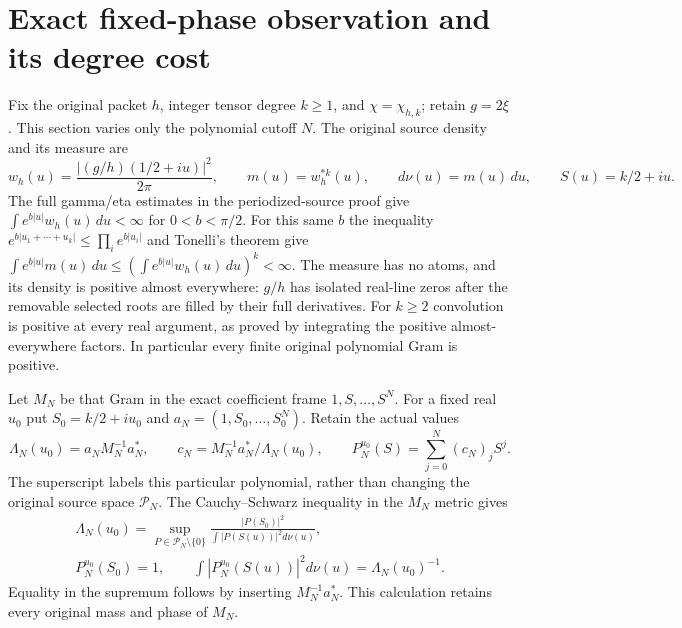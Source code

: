 \documentclass{article}
\begin{document}
\maketitle
\section{Exact fixed-phase observation and its degree cost}
\label{sec:holonomy-degree-cost}

Fix the original packet $h$, integer tensor degree $k\ge1$, and
$\chi=\chi_{h,k}$; retain $g=2\xi$. This section varies only the
polynomial cutoff $N$. The original source density and its measure are
\[
 w_h(u)=\frac{|(g/h)(1/2+iu)|^2}{2\pi},\qquad
 m(u)=w_h^{*k}(u),\qquad d\nu(u)=m(u)\,du,
 \qquad S(u)=k/2+iu .
 \tag{HD1}
\]
The full gamma/eta estimates in the periodized-source proof give
$\int e^{b|u|}w_h(u)\,du<\infty$ for $0<b<\pi/2$.
For this same $b$ the inequality
$e^{b|u_1+\cdots+u_k|}\le\prod_i e^{b|u_i|}$ and Tonelli's theorem
give
$\int e^{b|u|}m(u)\,du\le(\int e^{b|u|}w_h(u)\,du)^k<\infty$.
The measure has no atoms, and its density is positive almost everywhere:
$g/h$ has isolated real-line zeros after the removable selected roots
are filled by their full derivatives. For $k\ge2$ convolution is
positive at every real argument, as proved by integrating the positive
almost-everywhere factors. In particular every finite original
polynomial Gram is positive.

Let $M_N$ be that Gram in the exact coefficient frame
$1,S,\ldots,S^N$. For a fixed real $u_0$ put $S_0=k/2+iu_0$ and
$a_N=(1,S_0,\ldots,S_0^N)$. Retain the actual values
\[
 \Lambda_N(u_0)=a_NM_N^{-1}a_N^*,\qquad
 c_N=M_N^{-1}a_N^*/\Lambda_N(u_0),\qquad
 P_N^{u_0}(S)=\sum_{j=0}^N(c_N)_j S^j .
 \tag{HD2}
\]
The superscript labels this particular polynomial, rather than changing
the original source space $\mathcal P_N$. The Cauchy--Schwarz inequality
in the $M_N$ metric gives
\[
\begin{gathered}
 \Lambda_N(u_0)=\sup_{P\in\mathcal P_N\setminus\{0\}}
    \frac{|P(S_0)|^2}{\int|P(S(u))|^2d\nu(u)},\\
 P_N^{u_0}(S_0)=1,\qquad
 \int|P_N^{u_0}(S(u))|^2d\nu(u)=\Lambda_N(u_0)^{-1}.
\end{gathered}\tag{HD3}
\]
Equality in the supremum follows by inserting $M_N^{-1}a_N^*$.
This calculation retains every original mass and phase of $M_N$.
\end{document}
